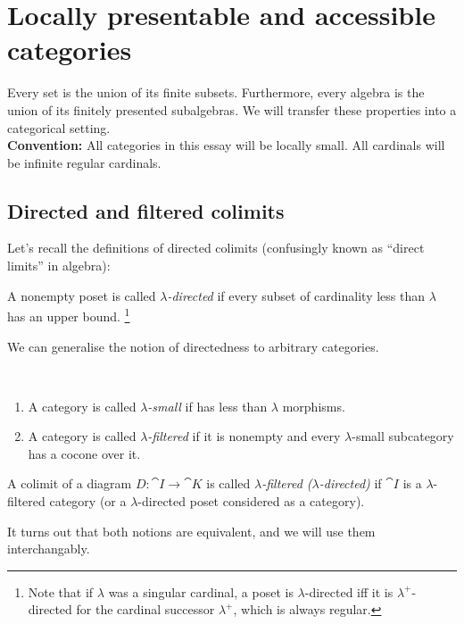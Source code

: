 \section{Locally presentable and accessible categories}
\label{sec:presentableaccessible}


Every set is the union of its finite subsets. Furthermore, every algebra is the union of its finitely presented subalgebras. We will transfer these properties into a categorical setting. \\

\textbf{Convention: } All categories in this essay will be locally small. All cardinals will be infinite regular cardinals.

\subsection{Directed and filtered colimits}

Let's recall the definitions of directed colimits (confusingly known as ``direct limits'' in algebra):
\begin{Definition}
A nonempty poset is called \emph{$\lambda$-directed} if every subset of cardinality less than $\lambda$ has an upper bound. \footnote{Note that if $\lambda$ was a singular cardinal, a poset is $\lambda$-directed iff it is $\lambda^+$-directed for the cardinal successor $\lambda^+$, which is always regular.}
\end{Definition}

We can generalise the notion of directedness to arbitrary categories.

\begin{Definition}\
\begin{enumerate}
\item A category is called \emph{$\lambda$-small} if has less than $\lambda$ morphisms.
\item A category is called \emph{$\lambda$-filtered} if it is nonempty and every $\lambda$-small subcategory has a cocone over it. 
\end{enumerate}
A colimit of a diagram $D : \cat I \to \cat K$ is called \emph{$\lambda$-filtered ($\lambda$-directed)} if $\cat I$ is a $\lambda$-filtered category (or a $\lambda$-directed poset considered as a category). 
\end{Definition}

It turns out that both notions are equivalent, and we will use them interchangably.

